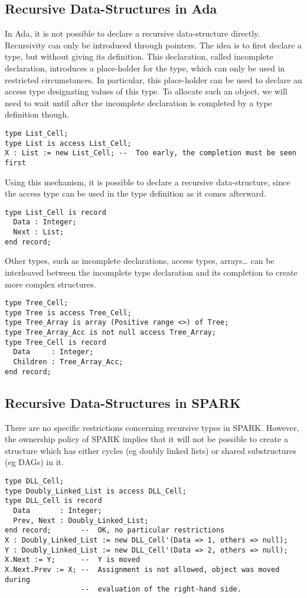 \documentclass[runningheads]{llncs}
\begin{document}
\subsection{Recursive Data-Structures in Ada}
In Ada, it is not possible to declare a recursive data-structure directly. Recursivity can only be introduced through pointers. The idea is to first declare a type, but without giving its definition. This declaration, called incomplete declaration, introduces a place-holder for the type, which can only be used in restricted circumstances. In particular, this place-holder can be used to declare an access type designating values of this type. To allocate such an object, we will need to wait until after the incomplete declaration is completed by a type definition though.
\begin{lstlisting}
type List_Cell;
type List is access List_Cell;
X : List := new List_Cell; --  Too early, the completion must be seen first
\end{lstlisting}
Using this mechanism, it is possible to declare a recursive data-structure, since the access type can be used in the type definition as it comes afterward.
\begin{lstlisting}
type List_Cell is record
  Data : Integer;
  Next : List;
end record;
\end{lstlisting}
Other types, such as incomplete declarations, access types, arrays… can be interleaved between the incomplete type declaration and its completion to create more complex structures.
\begin{lstlisting}
type Tree_Cell;
type Tree is access Tree_Cell;
type Tree_Array is array (Positive range <>) of Tree;
type Tree_Array_Acc is not null access Tree_Array;
type Tree_Cell is record
  Data     : Integer;
  Children : Tree_Array_Acc;
end record;
\end{lstlisting}

\subsection{Recursive Data-Structures in SPARK}
There are no specific restrictions concerning recursive types in SPARK. However, the ownership policy of SPARK implies that it will not be possible to create a structure which has either cycles (eg doubly linked lists) or shared substructures (eg DAGs) in it.
\begin{lstlisting}
type DLL_Cell;
type Doubly_Linked_List is access DLL_Cell;
type DLL_Cell is record
  Data       : Integer;
  Prev, Next : Doubly_Linked_List;
end record;       --  OK, no particular restrictions
X : Doubly_Linked_List := new DLL_Cell'(Data => 1, others => null);
Y : Doubly_Linked_List := new DLL_Cell'(Data => 2, others => null);
X.Next := Y;      --  Y is moved
X.Next.Prev := X; --  Assignment is not allowed, object was moved during
                  --  evaluation of the right-hand side.
\end{lstlisting}
\end{document}
